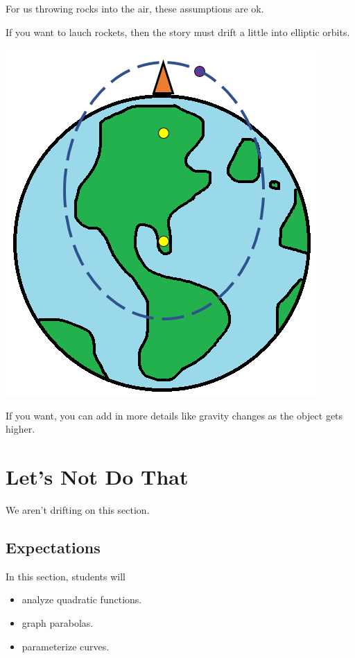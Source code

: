 \documentclass{ximera}
\begin{document}
For us throwing rocks into the air, these assumptions are ok.

If you want to lauch rockets, then the story must drift a little into elliptic orbits.  




\begin{center}
\includegraphics{Earth-Gravity.png}
\end{center}


If you want, you can add in more details like gravity changes as the object gets higher.






\section{Let's Not Do That}


We aren't drifting on this section.















\subsection{Expectations}





\begin{sectionOutcomes}
In this section, students will 

\begin{itemize}
\item analyze quadratic functions.
\item graph parabolas.
\item parameterize curves.
\end{itemize}
\end{sectionOutcomes}
\end{document}
